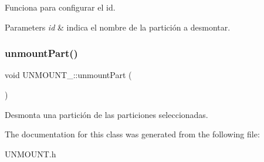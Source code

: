 Funciona para configurar el id. 
\begin{DoxyParams}{Parameters}
{\em id} & indica el nombre de la partición a desmontar. \\
\hline
\end{DoxyParams}
\mbox{\label{classUNMOUNT___a23cf126236a050b9254fa2a076e051a4}} 
\subsubsection{\texorpdfstring{unmount\+Part()}{unmountPart()}}
{\footnotesize\ttfamily void U\+N\+M\+O\+U\+N\+T\+\_\+\+::unmount\+Part (\begin{DoxyParamCaption}{ }\end{DoxyParamCaption})}

Desmonta una partición de las particiones seleccionadas. 

The documentation for this class was generated from the following file\+:\begin{DoxyCompactItemize}
\item 
U\+N\+M\+O\+U\+N\+T.\+h\end{DoxyCompactItemize}
